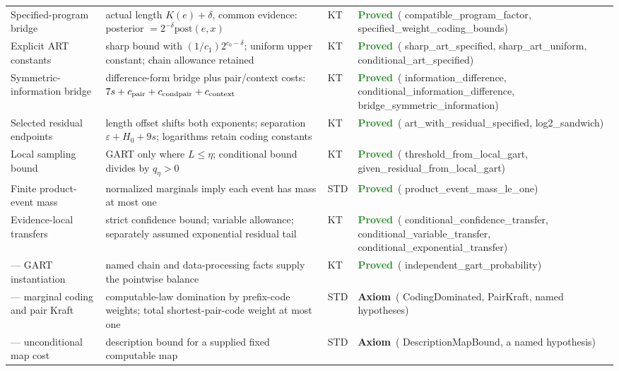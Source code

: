 \documentclass[11pt,a4paper]{article}
\newcommand{\lean}[1]{{\ttfamily\small
  \let\leanunderscore\_\def\_{\leanunderscore\allowbreak}#1}}
\newcommand{\stproved}{\textcolor{ForestGreen}{\textbf{Proved}}}
\newcommand{\staxiom}{\textcolor{bcomblue}{\textbf{Axiom}}}
\begin{document}
{\begin{longtable}{@{}p{2.1cm}p{6.6cm}p{1.0cm}p{2.6cm}@{}}
Specified-program bridge & actual length $K(e)+\delta$, common evidence: posterior $=2^{-\delta}\mathrm{post}(e,x)$ & KT &
  \stproved\ (\lean{compatible\_\allowbreak program\_factor}, \lean{specified\_weight\_\allowbreak coding\_bounds}) \\
Explicit ART constants & sharp bound with $(1/c_1)2^{c_0-\delta}$; uniform upper constant; chain allowance retained & KT &
  \stproved\ (\lean{sharp\_art\_\allowbreak specified}, \lean{sharp\_art\_\allowbreak uniform}, \lean{conditional\_art\_\allowbreak specified}) \\
Symmetric-information bridge & difference-form bridge plus pair/context costs: $7s+c_{\rm pair}+c_{\rm condpair}+c_{\rm context}$ & KT &
  \stproved\ (\lean{information\_\allowbreak difference}, \lean{conditional\_\allowbreak information\_difference}, \lean{bridge\_symmetric\_\allowbreak information}) \\
Selected residual endpoints & length offset shifts both exponents; separation $\varepsilon+H_0+9s$; logarithms retain coding constants & KT &
  \stproved\ (\lean{art\_with\_residual\_\allowbreak specified}, \lean{log2\_\allowbreak sandwich}) \\
Local sampling bound & GART only where $L\le\eta$; conditional bound divides by $q_\eta>0$ & KT &
  \stproved\ (\lean{threshold\_from\_\allowbreak local\_gart}, \lean{given\_residual\_\allowbreak from\_local\_gart}) \\
Finite product-event mass & normalized marginals imply each event has mass at most one & STD &
  \stproved\ (\lean{product\_event\_\allowbreak mass\_le\_one}) \\
Evidence-local transfers & strict confidence bound; variable allowance; separately assumed exponential residual tail & KT &
  \stproved\ (\lean{conditional\_\allowbreak confidence\_transfer}, \lean{conditional\_\allowbreak variable\_transfer}, \lean{conditional\_\allowbreak exponential\_transfer}) \\
--- GART instantiation & named chain and data-processing facts supply the pointwise balance & KT &
  \stproved\ (\lean{independent\_gart\_\allowbreak probability}) \\
--- marginal coding and pair Kraft & computable-law domination by prefix-code weights; total shortest-pair-code weight at most one & STD &
  \staxiom\ (\lean{Coding\allowbreak Dominated}, \lean{PairKraft}, named hypotheses) \\
--- unconditional map cost & description bound for a supplied fixed computable map & STD &
  \staxiom\ (\lean{Description\allowbreak Map\allowbreak Bound}, a named hypothesis) \\

\end{longtable}}
\end{document}
